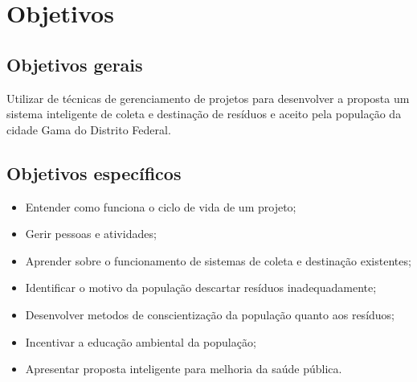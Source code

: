 \section{Objetivos}

  \subsection{Objetivos gerais}

    Utilizar de técnicas de gerenciamento
    de projetos para desenvolver a proposta um sistema inteligente de coleta
    e destinação de resíduos e aceito pela população
    da cidade Gama do Distrito Federal.

  \subsection{Objetivos específicos}

      \begin{itemize}
        \item Entender como funciona o ciclo de vida de um projeto;
        \item Gerir pessoas e atividades;
        \item Aprender sobre o funcionamento de sistemas de coleta e destinação existentes;
        \item Identificar o motivo da população descartar resíduos inadequadamente;
        \item Desenvolver metodos de conscientização da população quanto aos resíduos;
        \item Incentivar a educação ambiental da população;
        \item Apresentar proposta inteligente para melhoria da saúde pública.
      \end{itemize}
